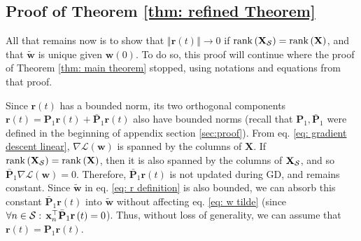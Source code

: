 \documentclass[twoside,11pt,english]{article}
\begin{document}
\subsection{Proof of Theorem \ref{thm: refined Theorem} \label{subsec:Proof-of-refined-Theorem}}

All that remains now is to show that $\left\Vert \mathbf{r}\left(t\right)\right\Vert \rightarrow0$
if $\mathrm{rank}\left(\mathbf{X}_{\mathcal{S}}\right)=\mathrm{rank}\left(\mathbf{X}\right)$,
and that $\tilde{\mathbf{w}}$ is unique given $\mathbf{w}\left(0\right)$.
To do so, this proof will continue where the proof of Theorem \ref{thm: main theorem}
stopped, using notations and equations from that proof.

Since $\mathbf{r}\left(t\right)$ has a bounded norm, its two orthogonal
components $\mathbf{r}\left(t\right)=\mathbf{P}_{1}\mathbf{r}\left(t\right)+\bar{\mathbf{P}}_{1}\mathbf{r}\left(t\right)$
also have bounded norms (recall that $\mathbf{P}_{1},\bar{\mathbf{P}}_{1}$
were defined in the beginning of appendix section \ref{sec:proof}).
From eq. \ref{eq: gradient descent linear}, $\nabla\mathcal{L}\left(\mathbf{w}\right)$
is spanned by the columns of $\mathbf{X}$. If $\mathrm{rank}\left(\mathbf{X}_{\mathcal{S}}\right)=\mathrm{rank}\left(\mathbf{X}\right)$,
then it is also spanned by the columns of $\mathbf{X}_{\mathcal{S}}$, and
so $\bar{\mathbf{P}}_{1}\nabla\mathcal{L}\left(\mathbf{w}\right)=0$.
Therefore, $\bar{\mathbf{P}}_{1}\mathbf{r}\left(t\right)$ is not
updated during GD, and remains constant. Since $\tilde{\mathbf{w}}$
in eq. \ref{eq: r definition} is also bounded, we can absorb this
constant $\bar{\mathbf{P}}_{1}\mathbf{r}\left(t\right)$ into \textbf{$\tilde{\mathbf{w}}$}
without affecting eq. \ref{eq: w tilde} (since $\forall n\in\mathcal{S}:\,\mathbf{x}_{n}^{\top}\bar{\mathbf{P}}_{1}\mathbf{r}\left(t\right)=0$).
Thus, without loss of generality, we can assume that $\mathbf{r}\left(t\right)=\mathbf{P}_{1}\mathbf{r}\left(t\right)$.
\end{document}
